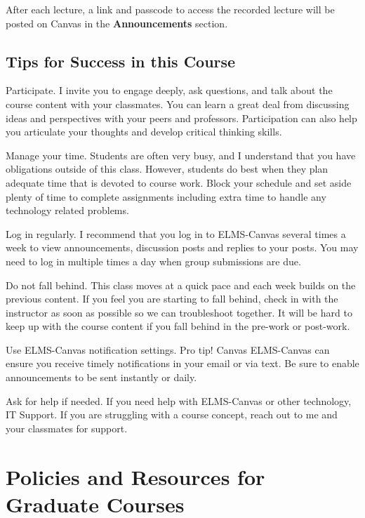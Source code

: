 \documentclass[11pt,usenames,dvipsnames,svgnames,x11names,letterpaper]{article}
\begin{document}
After each lecture, a link and passcode to access the recorded lecture will be posted on Canvas in the \textbf{Announcements} section.
\vspace{0.3cm}


\subsection{Tips for Success in this Course}
\begin{compactenum}
    \item Participate. I invite you to engage deeply, ask questions, and talk about the course content with your classmates. You can learn a great deal from discussing ideas and perspectives with your peers and professors. Participation can also help you articulate your thoughts and develop critical thinking skills.
    \item Manage your time. Students are often very busy, and I understand that you have obligations outside of this class. However, students do best when they plan adequate time that is devoted to course work. Block your schedule and set aside plenty of time to complete assignments including extra time to handle any technology related problems.
    \item Log in regularly. I recommend that you log in to ELMS-Canvas several times a week to view announcements, discussion posts and replies to your posts. You may need to log in multiple times a day when group submissions are due.
    \item Do not fall behind. This class moves at a quick pace and each week builds on the previous content. If you feel you are starting to fall behind, check in with the instructor as soon as possible so we can troubleshoot together. It will be hard to keep up with the course content if you fall behind in the pre-work or post-work.
    \item Use ELMS-Canvas notification settings. Pro tip! Canvas ELMS-Canvas can ensure you receive timely notifications in your email or via text. Be sure to enable announcements to be sent instantly or daily.
    \item Ask for help if needed. If you need help with ELMS-Canvas or other technology, IT Support. If you are struggling with a course concept, reach out to me and your classmates for support.
\end{compactenum}


\section{Policies and Resources for Graduate Courses}
\end{document}
